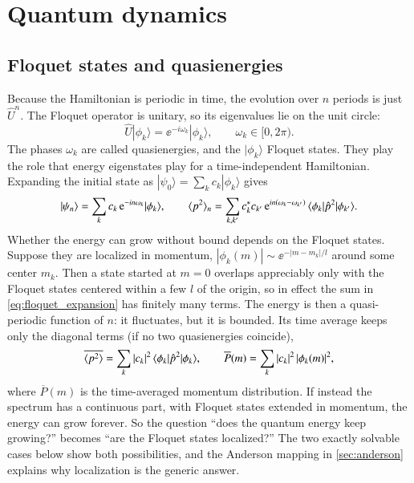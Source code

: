 \section{Quantum dynamics}
\label{sec:quantum}

\subsection{Floquet states and quasienergies}
\label{sec:floquet}

Because the Hamiltonian is periodic in time, the evolution over $n$ periods is just $\hat U^n$. The Floquet
operator is unitary, so its eigenvalues lie on the unit circle:
\begin{equation}
  \hat U|\phi_k\rangle = \ee^{-i\omega_k}|\phi_k\rangle, \qquad \omega_k \in [0, 2\pi).
\end{equation}
The phases $\omega_k$ are called quasienergies, and the $|\phi_k\rangle$ Floquet states. They play the role
that energy eigenstates play for a time-independent Hamiltonian. Expanding the initial state as
$|\psi_0\rangle = \sum_k c_k|\phi_k\rangle$ gives
\begin{equation}
  |\psi_n\rangle = \sum_k c_k\,\mathrm{e}^{-in\omega_k}|\phi_k\rangle,
  \qquad
  \langle p^2 \rangle_n = \sum_{k,k'} c_k^* c_{k'}\,\mathrm{e}^{in(\omega_k - \omega_{k'})}\,\langle\phi_k|\hat p^2|\phi_{k'}\rangle.
  \label{eq:floquet_expansion}
\end{equation}
Whether the energy can grow without bound depends on the Floquet states. Suppose they are localized in
momentum, $|\phi_k(m)| \sim \ee^{-|m - m_k|/l}$ around some center $m_k$. Then a state started at $m = 0$
overlaps appreciably only with the Floquet states centered within a few $l$ of the origin, so in effect the
sum in \cref{eq:floquet_expansion} has finitely many terms. The energy is then a quasi-periodic function of
$n$: it fluctuates, but it is bounded. Its time average keeps only the diagonal terms (if no two quasienergies
coincide),
\begin{equation}
  \overline{\langle p^2 \rangle} = \sum_k |c_k|^2\,\langle\phi_k|\hat p^2|\phi_k\rangle,
  \qquad
  \overline{P}(m) = \sum_k |c_k|^2\,|\phi_k(m)|^2,
  \label{eq:time_average}
\end{equation}
where $\overline{P}(m)$ is the time-averaged momentum distribution. If instead the spectrum has a
continuous part, with Floquet states extended in momentum, the energy can grow forever. So the question
``does the quantum energy keep growing?'' becomes ``are the Floquet states localized?'' The two exactly
solvable cases below show both possibilities, and the Anderson mapping in \cref{sec:anderson} explains why
localization is the generic answer.

